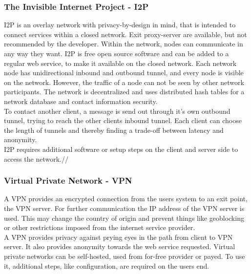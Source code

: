     
    
    \subsubsection{The Invisible Internet Project - I2P}
        I2P is an overlay network with privacy-by-design in mind, that is intended to connect services within a closed network.
        Exit proxy-server are available, but not recommended by the developer. Within the network, nodes can communicate in any way they want. I2P is free open source software and can be added to a regular web service, to make it available on the closed network. Each network node has unidirectional inbound and outbound tunnel, and every node is visible on the network. However, the traffic of a node can not be seen by other network participants. The network is decentralized and uses distributed hash tables for a network database and contact information security\cite{i2p_intro_2014}.\\
        To contact another client, a message is send out through it's own outbound tunnel, trying to reach the other clients inbound tunnel. Each client can choose the length of tunnels and thereby finding a trade-off between latency and anonymity\cite{anoncoin_i2p_2018}.\\
        I2P requires additional software or setup steps on the client and server side to access the network.//
        
        
        
    
    \subsubsection{Virtual Private Network - VPN}
        A VPN provides an encrypted connection from the users system to an exit point, the VPN server. For further communication the IP address of the VPN server is used. This may change the country of origin and prevent things like geoblocking or other restrictions imposed from the internet service provider\cite{microsoft_virtual_2009}.\\
        A VPN provides privacy against prying eyes in the path from client to VPN server. It also provides anonymity towards the web service requested. Virtual private networks can be self-hosted, used from for-free provider or payed. To use it, additional steps, like configuration, are required on the users end.\\

    
\newpage
    
